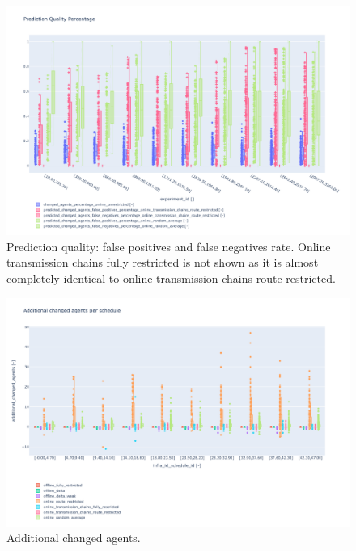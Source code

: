 \documentclass{article}
\begin{document}
\begin{figure}[hbtp]
    \includegraphics[width=\textwidth]{Figures/04_computational_results/prediction_quality.pdf}
	\caption{Prediction quality: false positives and false negatives rate. Online transmission chains fully restricted is not shown as it is almost completely identical to online transmission chains route restricted.}
	\label{fig:prediction_quality}
\end{figure}

\begin{figure}[hbtp]
    \includegraphics[width=\textwidth]{Figures/04_computational_results/additional_changed_agents.pdf}
	\caption{Additional changed agents.}
	\label{fig:additional_changed_agents}
\end{figure}




\end{document}
